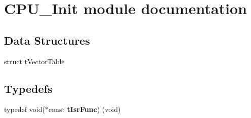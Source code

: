 \hypertarget{group___c_p_u___init__module}{}\section{C\+P\+U\+\_\+\+Init module documentation}
\label{group___c_p_u___init__module}
\subsection*{Data Structures}
\begin{DoxyCompactItemize}
\item 
struct \hyperlink{structt_vector_table}{t\+Vector\+Table}
\end{DoxyCompactItemize}
\subsection*{Typedefs}
\begin{DoxyCompactItemize}
\item 
typedef void($\ast$const {\bfseries t\+Isr\+Func}) (void)\hypertarget{group___c_p_u___init__module_gafea04d3e8135767c03ce099f02e97437}{}\label{group___c_p_u___init__module_gafea04d3e8135767c03ce099f02e97437}

\end{DoxyCompactItemize}
